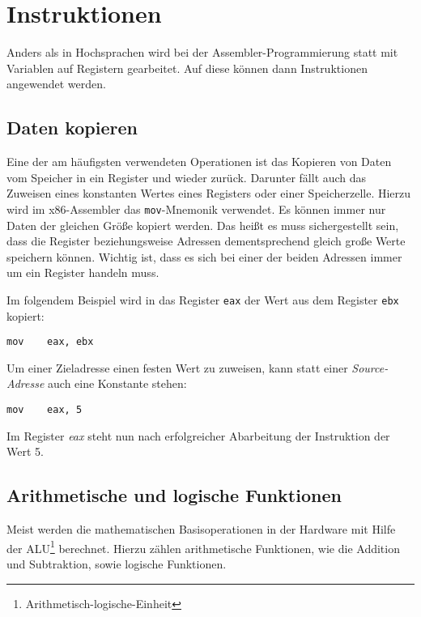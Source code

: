 \section{Instruktionen}

Anders als in Hochsprachen wird bei der Assembler-Programmierung statt mit Variablen auf Registern gearbeitet. Auf diese können dann Instruktionen angewendet werden.

\subsection{Daten kopieren}
Eine der am häufigsten verwendeten Operationen ist das Kopieren von Daten vom Speicher in ein Register und wieder zurück.
Darunter fällt auch das Zuweisen eines konstanten Wertes eines Registers oder einer Speicherzelle.
Hierzu wird im x86-Assembler das \texttt{mov}-Mnemonik verwendet.
Es können immer nur Daten der gleichen Größe kopiert werden.
Das heißt es muss sichergestellt sein, dass die Register beziehungsweise Adressen dementsprechend gleich große Werte speichern können.
Wichtig ist, dass es sich bei einer der beiden Adressen immer um ein Register handeln muss.

Im folgendem Beispiel wird in das Register \texttt{eax} der Wert aus dem Register \texttt{ebx} kopiert:

\begin{lstlisting}
mov    eax, ebx
\end{lstlisting}

Um einer Zieladresse einen festen Wert zu zuweisen, kann statt einer \textit{Source-Adresse} auch eine Konstante stehen:

\begin{lstlisting}
mov    eax, 5
\end{lstlisting}

Im Register \textit{eax} steht nun nach erfolgreicher Abarbeitung der Instruktion der Wert 5.


\subsection{Arithmetische und logische Funktionen}
Meist werden die mathematischen Basisoperationen in der Hardware mit Hilfe der ALU\footnote{Arithmetisch-logische-Einheit} berechnet.
Hierzu zählen arithmetische Funktionen, wie die Addition und Subtraktion, sowie logische Funktionen.

